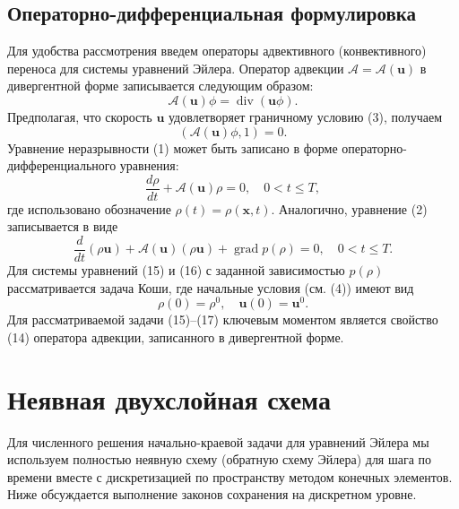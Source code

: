 \documentclass[10pt,twocolumn]{article}
\begin{document}
\subsection{Операторно-дифференциальная формулировка}

Для удобства рассмотрения введем операторы адвективного (конвективного) переноса для системы уравнений Эйлера. Оператор адвекции \(\mathcal{A} = \mathcal{A}(\mathbf {u})\) в дивергентной форме записывается следующим образом:
\begin{equation}
\mathcal{A}(\mathbf {u})\phi = \operatorname{div}(\mathbf {u}\phi). \tag{13}
\end{equation}
Предполагая, что скорость \(\mathbf{u}\) удовлетворяет граничному условию (3), получаем
\begin{equation}
(\mathcal{A}(\mathbf {u})\phi ,1) = 0. \tag{14}
\end{equation}
Уравнение неразрывности (1) может быть записано в форме операторно-дифференциального уравнения:
\begin{equation}
\frac{d\rho}{dt} +\mathcal{A}(\mathbf {u})\rho = 0,\quad 0< t\leq T, \tag{15}
\end{equation}
где использовано обозначение \(\rho (t) = \rho (\mathbf {x},t)\). Аналогично, уравнение (2) записывается в виде
\begin{equation}
\frac{d}{dt} (\rho \mathbf {u}) + \mathcal{A}(\mathbf {u})(\rho \mathbf {u}) + \operatorname{grad}p(\rho) = 0,\quad 0< t\leq T. \tag{16}
\end{equation}
Для системы уравнений (15) и (16) с заданной зависимостью \(p(\rho)\) рассматривается задача Коши, где начальные условия (см. (4)) имеют вид
\begin{equation}
\rho (0) = \rho^{0},\quad \mathbf {u}(0) = \mathbf {u}^{0}. \tag{17}
\end{equation}
Для рассматриваемой задачи (15)--(17) ключевым моментом является свойство (14) оператора адвекции, записанного в дивергентной форме.

\section{Неявная двухслойная схема}

Для численного решения начально-краевой задачи для уравнений Эйлера мы используем полностью неявную схему (обратную схему Эйлера) для шага по времени вместе с дискретизацией по пространству методом конечных элементов. Ниже обсуждается выполнение законов сохранения на дискретном уровне.
\end{document}
